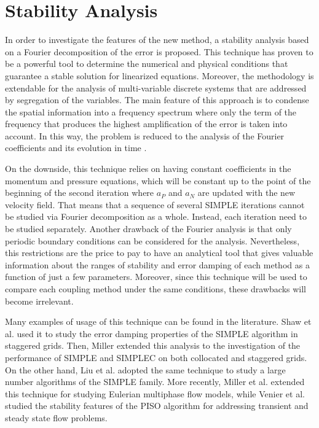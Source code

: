 \documentclass[final,3p,times,11pt,onecolumn]{myElsarticle}
\numberwithin{equation}{section}
\begin{document}
\section{Stability Analysis}
\label{sec:fourier}

In order to investigate the features of the new method, a stability analysis based on a Fourier decomposition of the error is proposed. This technique has proven to be a powerful tool to determine the numerical and physical conditions that guarantee a stable solution for linearized equations. Moreover, the methodology is extendable for the analysis of multi-variable discrete systems that are addressed by segregation of the variables. The main feature of this approach is to condense the spatial information into a frequency spectrum where only the term of the frequency that produces the highest amplification of the error is taken into account. In this way, the problem is reduced to the analysis of the Fourier coefficients and its evolution in time \cite{hirsch}. 

On the downside, this technique relies on having constant coefficients in the momentum and pressure equations, which will be constant up to the point of the beginning of the second iteration where $a_P$ and $a_N$ are updated with the new velocity field. That means that a sequence of several SIMPLE iterations cannot be studied via Fourier decomposition as a whole. Instead, each iteration need to be studied separately. Another drawback of the Fourier analysis is that only periodic boundary conditions can be considered for the analysis. Nevertheless, this restrictions are the price to pay to have an analytical tool that gives valuable information about the ranges of stability and error damping of each method as a function of just a few parameters. Moreover, since this technique will be used to compare each coupling method under the same conditions, these drawbacks will become irrelevant.

Many examples of usage of this technique can be found in the literature. Shaw et al. \cite{shaw} used it to study the error damping properties of the SIMPLE algorithm in staggered grids. Then, Miller \cite{miller1} extended this analysis to the investigation of the performance of SIMPLE and SIMPLEC on both collocated and staggered grids. On the other hand, Liu et al. \cite{liu} adopted the same technique to study a large number algorithms of the SIMPLE family. More recently, Miller et al. \cite{miller2} extended this technique for studying Eulerian multiphase flow models, while Venier et al. \cite{venier} studied the stability features of the PISO algorithm for addressing transient and steady state flow problems.
\end{document}
